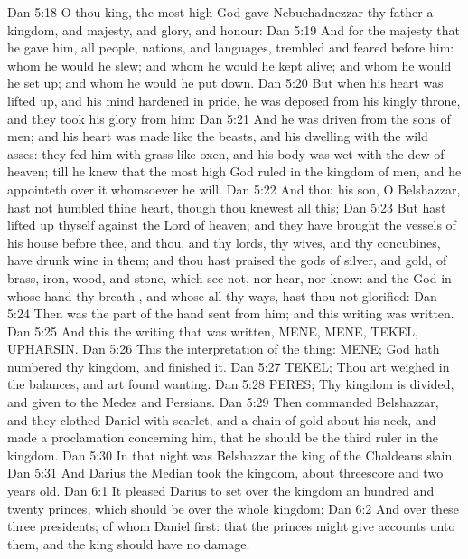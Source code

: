 \vs Dan 5:18 O thou king, the most high God gave Nebuchadnezzar thy father a kingdom, and majesty, and glory, and honour:
\vs Dan 5:19 And for the majesty that he gave him, all people, nations, and languages, trembled and feared before him: whom he would he slew; and whom he would he kept alive; and whom he would he set up; and whom he would he put down.
\vs Dan 5:20 But when his heart was lifted up, and his mind hardened in pride, he was deposed from his kingly throne, and they took his glory from him:
\vs Dan 5:21 And he was driven from the sons of men; and his heart was made like the beasts, and his dwelling  with the wild asses: they fed him with grass like oxen, and his body was wet with the dew of heaven; till he knew that the most high God ruled in the kingdom of men, and  he appointeth over it whomsoever he will.
\vs Dan 5:22 And thou his son, O Belshazzar, hast not humbled thine heart, though thou knewest all this;
\vs Dan 5:23 But hast lifted up thyself against the Lord of heaven; and they have brought the vessels of his house before thee, and thou, and thy lords, thy wives, and thy concubines, have drunk wine in them; and thou hast praised the gods of silver, and gold, of brass, iron, wood, and stone, which see not, nor hear, nor know: and the God in whose hand thy breath , and whose  all thy ways, hast thou not glorified:
\vs Dan 5:24 Then was the part of the hand sent from him; and this writing was written.
\vs Dan 5:25 And this  the writing that was written, MENE, MENE, TEKEL, UPHARSIN.
\vs Dan 5:26 This  the interpretation of the thing: MENE; God hath numbered thy kingdom, and finished it.
\vs Dan 5:27 TEKEL; Thou art weighed in the balances, and art found wanting.
\vs Dan 5:28 PERES; Thy kingdom is divided, and given to the Medes and Persians.
\vs Dan 5:29 Then commanded Belshazzar, and they clothed Daniel with scarlet, and  a chain of gold about his neck, and made a proclamation concerning him, that he should be the third ruler in the kingdom.
\vs Dan 5:30 In that night was Belshazzar the king of the Chaldeans slain.
\vs Dan 5:31 And Darius the Median took the kingdom,  about threescore and two years old.
\vs Dan 6:1 It pleased Darius to set over the kingdom an hundred and twenty princes, which should be over the whole kingdom;
\vs Dan 6:2 And over these three presidents; of whom Daniel  first: that the princes might give accounts unto them, and the king should have no damage.
